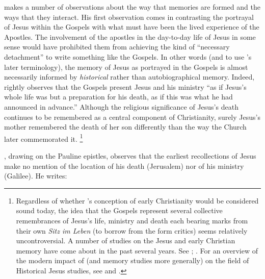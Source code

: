 \halbwachs makes a number of observations about the way that memories are formed and the ways that they interact. His first observation comes in contrasting the portrayal of Jesus within the Gospels with what must have been the lived experience of the Apostles.%
    \autocite[193--198]{halbwachs1992}
The involvement of the apostles in the day-to-day life of Jesus in some sense would have prohibited them from achieving the kind of ``necessary detachment'' to write something like the Gospels. In other words (and to use \halbwachs's later terminology), the memory of Jesus as portrayed in the Gospels is almost necessarily informed by \emph{historical} rather than autobiographical memory.%
    \autocite[194]{halbwachs1992}
Indeed, \halbwachs rightly observes that the Gospels present Jesus and his ministry ``as if Jesus's whole life was but a preparation for his death, as if this was what he had announced in advance.''%
    \autocite[198]{halbwachs1992}
Although the religious significance of Jesus's death continues to be remembered as a central component of Christianity, surely Jesus's mother remembered the death of her son differently than the way the Church later commemorated it.%
    \footnote{%
        Regardless of whether \halbwachs's conception of early Christianity would be considered sound today, the idea that the Gospels represent several collective remembrances of Jesus's life, ministry and death each bearing marks from their own \emph{Sitz im Leben} (to borrow from the form critics) seems relatively uncontroversial. A number of studies on the Jesus and early Christian memory have come about in the past several years. See 
        \cite{ledonne2009}; 
        \cite{rodriguez2010}. For an overview of the modern impact of \halbwachs (and memory studies more generally) on the field of Historical Jesus studies, see 
        \cite{keith_ec2015} and 
        \cite{keith_ec2015b}.}

\halbwachs, drawing on the Pauline epistles, observes that the earliest recollections of Jesus make no mention of the location of his death (Jerusalem) nor of his ministry (Galilee). He writes:  

